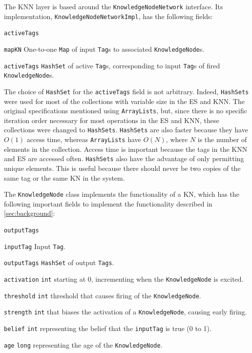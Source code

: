 \documentclass[titlepage,11pt]{article}
\newcommand{\code}[1]{\texttt{#1}}
\begin{document}
The KNN layer is based around the \code{KnowledgeNodeNetwork} interface. Its implementation, \code{KnowledgeNodeNetworkImpl}, has the following fields:

\begin{labeling}{\code{activeTags}}
	\item[\code{mapKN}] One-to-one \code{Map} of input \code{Tag}s to associated \code{KnowledgeNode}s.
	\item[\code{activeTags}] \code{HashSet} of active \code{Tag}s, corresponding to input \code{Tag}s of fired \code{KnowledgeNode}s.
\end{labeling}

The choice of \code{HashSet} for the \code{activeTags} field is not arbitrary. Indeed, \code{HashSets} were used for most of the collections with variable size in the ES and KNN. The original specifications mentioned using \code{ArrayLists}, but, since there is no specific iteration order necessary for most operations in the ES and KNN, these collections were changed to \code{HashSets}. \code{HashSets} are also faster because they have $O(1)$ access time, whereas \code{ArrayLists} have $O(N)$, where $N$ is the number of elements in the collection. Access time is important because the tags in the KNN and ES are accessed often. \code{HashSets} also have the advantage of only permitting unique elements. This is useful because there should never be two copies of the same tag or the same KN in the system.

The \code{KnowledgeNode} class implements the functionality of a KN, which has the following important fields to implement the functionality described in \autoref{sec:background}:

\begin{labeling}{\code{outputTags}}
	\item[\code{inputTag}] Input \code{Tag}.
	\item[\code{outputTags}] \code{HashSet} of output \code{Tags}.
	\item[\code{activation}] \code{int} starting at 0, incrementing when the \code{KnowledgeNode} is excited.
	\item[\code{threshold}] \code{int} threshold that causes firing of the \code{KnowledgeNode}.
	\item[\code{strength}] \code{int} that biases the activation of a \code{KnowledgeNode}, causing early firing.
	\item[\code{belief}] \code{int} representing the belief that the \code{inputTag} is true (0 to 1).
	\item[\code{age}] \code{long} representing the age of the \code{KnowledgeNode}.
\end{labeling}
\end{document}
